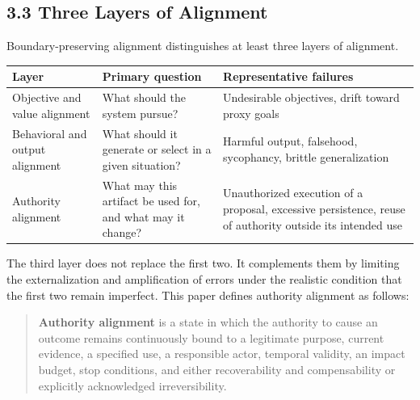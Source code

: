 \subsection{3.3 Three Layers of Alignment}\label{three-layers-of-alignment}

Boundary-preserving alignment distinguishes at least three layers of alignment.

{\def\LTcaptype{none} %
\begin{longtable}[]{@{}
  >{\raggedright\arraybackslash}p{}
  >{\raggedright\arraybackslash}p{}
  >{\raggedright\arraybackslash}p{}@{}}
\toprule\noalign{}
\begin{minipage}[b]{\linewidth}\raggedright
Layer
\end{minipage} & \begin{minipage}[b]{\linewidth}\raggedright
Primary question
\end{minipage} & \begin{minipage}[b]{\linewidth}\raggedright
Representative failures
\end{minipage} \\
\midrule\noalign{}
\endhead
\bottomrule\noalign{}
\endlastfoot
Objective and value alignment & What should the system pursue? & Undesirable objectives, drift toward proxy goals \\
Behavioral and output alignment & What should it generate or select in a given situation? & Harmful output, falsehood, sycophancy, brittle generalization \\
Authority alignment & What may this artifact be used for, and what may it change? & Unauthorized execution of a proposal, excessive persistence, reuse of authority outside its intended use \\
\end{longtable}
}

The third layer does not replace the first two. It complements them by limiting the externalization and amplification of errors under the realistic condition that the first two remain imperfect. This paper defines authority alignment as follows:

\begin{quote}
\textbf{Authority alignment} is a state in which the authority to cause an outcome remains continuously bound to a legitimate purpose, current evidence, a specified use, a responsible actor, temporal validity, an impact budget, stop conditions, and either recoverability and compensability or explicitly acknowledged irreversibility.
\end{quote}

